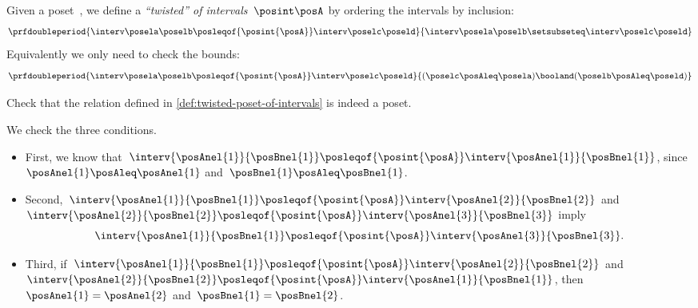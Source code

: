 \begin{marginfigure}
    \centering
    \caption{
        $\interv \posela \poselb
            \posleqof{\posint{\posA}}
            \interv \poselc \poseld$
    }
\end{marginfigure}


\begin{definition}
    \label{def:twisted-poset-of-intervals}
    Given a poset~\posA, we define a \emph{``twisted''  of intervals}~$\posint\posA$
    by ordering the intervals by inclusion:
    \begin{equation}\label{eq:twisted-1}
        \prfdoubleperiod{
            \interv \posela \poselb
            \posleqof{\posint{\posA}}
            \interv \poselc \poseld
        }{
            \interv \posela \poselb
            \setsubseteq
            \interv \poselc \poseld
        }
    \end{equation}
    Equivalently we only need to check the bounds:
    \begin{equation}\label{eq:twisted-2}
        \prfdoubleperiod{
            \interv \posela \poselb
            \posleqof{\posint{\posA}}
            \interv \poselc \poseld
        }{
            (\poselc \posAleq \posela ) \booland (\poselb \posAleq \poseld)
        }
    \end{equation}

\end{definition}

\begin{exercise}
    Check that the relation defined in \cref{def:twisted-poset-of-intervals} is indeed a poset.
\end{exercise}
\begin{solution}
    We check the three conditions.
    \begin{itemize}
        \item First, we know that~$\interv{\posAnel{1}}{\posBnel{1}}\posleqof{\posint{\posA}}\interv{\posAnel{1}}{\posBnel{1}}$, since~$\posAnel{1}\posAleq \posAnel{1}$ and~$\posBnel{1}\posAleq \posBnel{1}$.
        \item Second,~$\interv{\posAnel{1}}{\posBnel{1}}\posleqof{\posint{\posA}}\interv{\posAnel{2}}{\posBnel{2}}$ and~$\interv{\posAnel{2}}{\posBnel{2}}\posleqof{\posint{\posA}}\interv{\posAnel{3}}{\posBnel{3}}$ imply
              \begin{equation}
                  \interv{\posAnel{1}}{\posBnel{1}}\posleqof{\posint{\posA}}\interv{\posAnel{3}}{\posBnel{3}}.
              \end{equation}
        \item Third, if~$\interv{\posAnel{1}}{\posBnel{1}}\posleqof{\posint{\posA}}\interv{\posAnel{2}}{\posBnel{2}}$ and~$\interv{\posAnel{2}}{\posBnel{2}}\posleqof{\posint{\posA}}\interv{\posAnel{1}}{\posBnel{1}}$, then~$\posAnel{1}=\posAnel{2}$ and~$\posBnel{1}=\posBnel{2}$.
    \end{itemize}
\end{solution}

